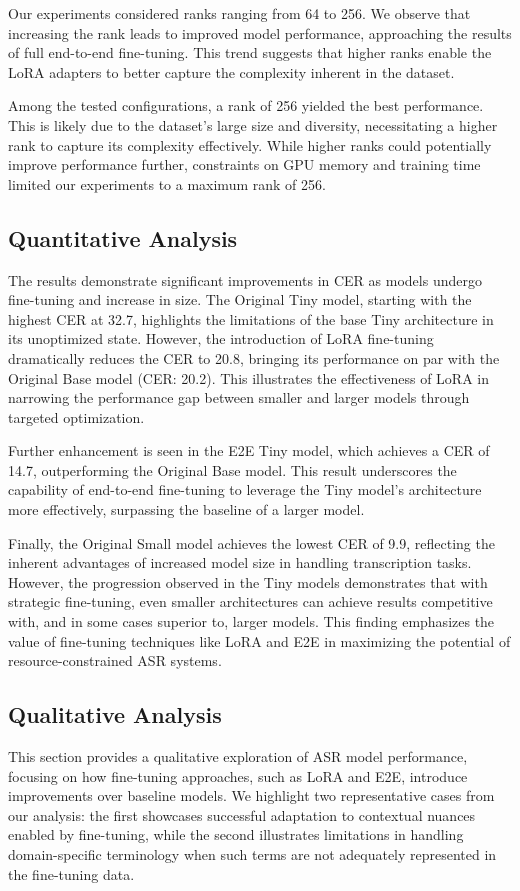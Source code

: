 \documentclass[10pt,twocolumn,letterpaper]{article}
\begin{document}
Our experiments considered ranks ranging from 64 to 256. We observe that increasing the rank leads to improved model performance, approaching the results of full end-to-end fine-tuning. This trend suggests that higher ranks enable the LoRA adapters to better capture the complexity inherent in the dataset.

Among the tested configurations, a rank of 256 yielded the best performance. This is likely due to the dataset's large size and diversity, necessitating a higher rank to capture its complexity effectively. While higher ranks could potentially improve performance further, constraints on GPU memory and training time limited our experiments to a maximum rank of 256.

\subsection{Quantitative Analysis}
The results demonstrate significant improvements in CER as models undergo fine-tuning and increase in size. The Original Tiny model, starting with the highest CER at 32.7, highlights the limitations of the base Tiny architecture in its unoptimized state. However, the introduction of LoRA fine-tuning dramatically reduces the CER to 20.8, bringing its performance on par with the Original Base model (CER: 20.2). This illustrates the effectiveness of LoRA in narrowing the performance gap between smaller and larger models through targeted optimization.

Further enhancement is seen in the E2E Tiny model, which achieves a CER of 14.7, outperforming the Original Base model. This result underscores the capability of end-to-end fine-tuning to leverage the Tiny model’s architecture more effectively, surpassing the baseline of a larger model.

Finally, the Original Small model achieves the lowest CER of 9.9, reflecting the inherent advantages of increased model size in handling transcription tasks. However, the progression observed in the Tiny models demonstrates that with strategic fine-tuning, even smaller architectures can achieve results competitive with, and in some cases superior to, larger models. This finding emphasizes the value of fine-tuning techniques like LoRA and E2E in maximizing the potential of resource-constrained ASR systems.

\subsection{Qualitative Analysis}
This section provides a qualitative exploration of ASR model performance, focusing on how fine-tuning approaches, such as LoRA and E2E, introduce improvements over baseline models. We highlight two representative cases from our analysis: the first showcases successful adaptation to contextual nuances enabled by fine-tuning, while the second illustrates limitations in handling domain-specific terminology when such terms are not adequately represented in the fine-tuning data.
\end{document}
